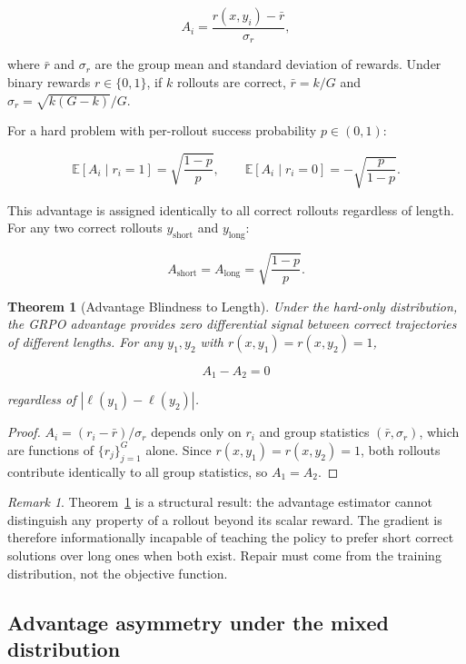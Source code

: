 \documentclass[11pt]{article}
\theoremstyle{rthm}
\newtheorem{theorem}{Theorem}[section]
\theoremstyle{rdef}
\theoremstyle{remark}
\newtheorem*{remark}{Remark}
\begin{document}
\[
A_i = \frac{r(x, y_i) - \bar{r}}{\sigma_r},
\]

where $\bar{r}$ and $\sigma_r$ are the group mean and standard
deviation of rewards. Under binary rewards $r \in \{0,1\}$, if
$k$ rollouts are correct, $\bar{r} = k/G$ and
$\sigma_r = \sqrt{k(G-k)}/G$.

For a hard problem with per-rollout success probability $p \in (0,1)$:

\[
\mathbb{E}[A_i \mid r_i = 1] = \sqrt{\frac{1-p}{p}}, \qquad
\mathbb{E}[A_i \mid r_i = 0] = -\sqrt{\frac{p}{1-p}}.
\]

This advantage is assigned identically to all correct rollouts
regardless of length. For any two correct rollouts
$y_{\mathrm{short}}$ and $y_{\mathrm{long}}$:

\[
A_{\mathrm{short}} = A_{\mathrm{long}} = \sqrt{\frac{1-p}{p}}.
\]

\begin{theorem}[Advantage Blindness to Length]
\label{thm:blind}
Under the hard-only distribution, the GRPO advantage provides zero
differential signal between correct trajectories of different lengths.
For any $y_1, y_2$ with $r(x,y_1) = r(x,y_2) = 1$,

\[
A_1 - A_2 = 0
\]

regardless of $|\ell(y_1) - \ell(y_2)|$.
\end{theorem}

\begin{proof}
$A_i = (r_i - \bar{r})/\sigma_r$ depends only on $r_i$ and group
statistics $(\bar{r}, \sigma_r)$, which are functions of
$\{r_j\}_{j=1}^G$ alone. Since $r(x,y_1) = r(x,y_2) = 1$, both
rollouts contribute identically to all group statistics, so
$A_1 = A_2$.
\end{proof}

\begin{remark}
Theorem~\ref{thm:blind} is a structural result: the advantage
estimator cannot distinguish any property of a rollout beyond its
scalar reward. The gradient is therefore informationally incapable
of teaching the policy to prefer short correct solutions over long
ones when both exist. Repair must come from the training
distribution, not the objective function.
\end{remark}

\subsection{Advantage asymmetry under the mixed distribution}
\end{document}
